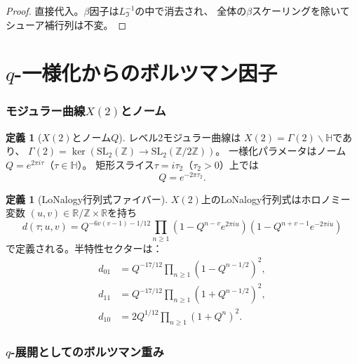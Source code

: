 \documentclass[12pt]{article}
\theoremstyle{plain}
\theoremstyle{definition}
\newtheorem{definition}[theorem]{定義}
\numberwithin{equation}{section}
\newcommand{\R}{\mathbb{R}}
\newcommand{\Z}{\mathbb{Z}}
\newcommand{\HH}{\mathbb{H}}
\newcommand{\fI}{\mathfrak{I}}
\begin{document}
\begin{proof}
直接代入。$\beta$因子は$L_{\fI}^{-1}$の中で消去され、
全体の$\beta$スケーリングを除いてシューア補行列は不変。
\end{proof}


\part{$q$-一様化からのボルツマン因子}

\section{モジュラー曲線$X(2)$とノーム}\label{sec:nome}

\begin{definition}[$X(2)$とノーム$Q$]
レベル2モジュラー曲線は
$X(2) = \Gamma(2)\backslash\HH$であり、
$\Gamma(2) = \ker(\mathrm{SL}_2(\Z)\to\mathrm{SL}_2(\Z/2\Z))$。
一様化パラメータはノーム$Q = e^{2\pi i\tau}$（$\tau\in\HH$）。
矩形スライス$\tau=i\tau_2$（$\tau_2>0$）上では
\begin{equation}\label{eq:nomerect}
Q = e^{-2\pi\tau_2}.
\end{equation}
\end{definition}

\begin{definition}[LoNalogy行列式ファイバー]\label{def:detfiber}
$X(2)$上のLoNalogy行列式はホロノミー変数
$(u,v)\in\R/\Z\times\R$を持ち~\cite{LoNalogyv87}
\begin{equation}\label{eq:detfiber}
d(\tau;u,v)
= Q^{-6v(v-1)-1/12}\prod_{n\geq 1}
\left(1-Q^{n-v}e^{2\pi iu}\right)
\left(1-Q^{n+v-1}e^{-2\pi iu}\right)
\end{equation}
で定義される。半特性セクターは：
\begin{align}
d_{01} &= Q^{-17/12}\prod_{n\geq1}\left(1-Q^{n-1/2}\right)^2,\\
d_{11} &= Q^{-17/12}\prod_{n\geq1}\left(1+Q^{n-1/2}\right)^2,\\
d_{10} &= 2Q^{1/12}\prod_{n\geq1}\left(1+Q^n\right)^2.
\end{align}
\end{definition}


\section{$q$-展開としてのボルツマン重み}\label{sec:boltzmann}
\end{document}
